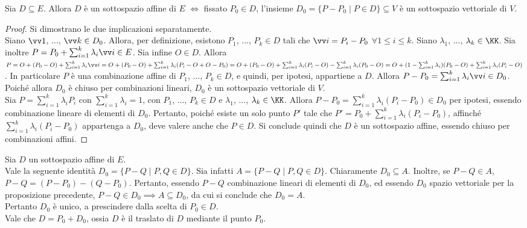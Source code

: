 \documentclass[11pt]{article}
\begin{document}
	\begin{proposition}
		Sia $D \subseteq E$. Allora $D$ è un sottospazio affine di $E$ $\iff$ fissato $P_0 \in D$, l'insieme
		$D_0 = \{ P - P_0 \mid P \in D \} \subseteq V$ è un sottospazio vettoriale di $V$.
	\end{proposition}
	
	\begin{proof}
		Si dimostrano le due implicazioni separatamente. \\
		
		\rightproof Siano $\vv 1$, ..., $\vv k \in D_0$. Allora, per definizione, esistono $P_1$, ...,
		$P_k \in D$ tali che $\vv i = P_i - P_0$ $\forall 1 \leq i \leq k$. Siano $\lambda_1$, ...,
		$\lambda_k \in \KK$. Sia inoltre $P = P_0 + \sum_{i=1}^k \lambda_i \vv i \in E$. Sia infine
		$O \in D$. Allora $P = O + (P_0 - O) + \sum_{i=1}^k \lambda_i \vv i = O + (P_0 - O) + \sum_{i=1}^k \lambda_i (P_i - O + O - P_0) = O + (P_0 - O) + \sum_{i=1}^k \lambda_i (P_i - O) - \sum_{i=1}^k \lambda_i (P_0 - O) =
		O + (1-\sum_{i=1}^k \lambda_i) (P_0 - O) + \sum_{i=1}^k \lambda_i (P_i - O)$. In particolare $P$
		è una combinazione affine di $P_1$, ..., $P_k \in D$, e quindi, per ipotesi, appartiene a $D$. Allora
		$P - P_0 =  \sum_{i=1}^k \lambda_i \vv i \in D_0$. Poiché allora $D_0$ è chiuso per combinazioni lineari,
		$D_0$ è un sottospazio vettoriale di $V$. \\
		
		\leftproof Sia $P = \sum_{i=1}^k \lambda_i P_i$ con $\sum_{i=1}^k \lambda_i = 1$, con $P_1$, ..., $P_k \in D$ e
		$\lambda_1$, ..., $\lambda_k \in \KK$. Allora $P - P_0 = \sum_{i=1}^k \lambda_i (P_i - P_0) \in D_0$ per ipotesi, essendo combinazione lineare di elementi di $D_0$. Pertanto, poiché esiste un solo punto $P'$
		tale che $P' = P_0 + \sum_{i=1}^k \lambda_i (P_i - P_0)$, affinché $\sum_{i=1}^k \lambda_i (P_i - P_0)$
		appartenga a $D_0$, deve valere anche che $P \in D$. Si conclude quindi che $D$ è un sottospazio
		affine, essendo chiuso per combinazioni affini.
	\end{proof}
	
	\begin{remark}Sia $D$ un sottospazio affine di $E$. \\

		\li Vale la seguente identità $D_0 = \{ P - Q \mid P, Q \in D \}$. Sia infatti $A = \{ P - Q \mid P, Q \in D \}$. Chiaramente $D_0 \subseteq A$.
		Inoltre, se $P-Q \in A$, $P-Q = (P-P_0) - (Q-P_0)$. Pertanto, essendo $P-Q$ combinazione lineari di elementi
		di $D_0$, ed essendo $D_0$ spazio vettoriale per la proposizione precedente, $P-Q \in D_0 \implies A \subseteq D_0$, da cui si conclude che $D_0 = A$. \\
		\li Pertanto $D_0$ è unico, a prescindere dalla scelta di $P_0 \in D$. \\
		\li Vale che $D = P_0 + D_0$, ossia $D$ è il traslato di $D$ mediante il punto $P_0$.
	\end{remark}
	
\end{document}
